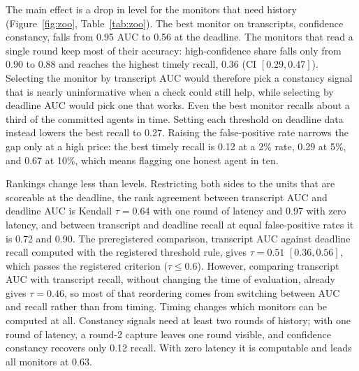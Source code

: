 \documentclass[pdflatex,sn-mathphys-num]{sn-jnl}
\theoremstyle{thmstyleone}%
\begin{document}
The main effect is a drop in level for the monitors that need history (Figure~\ref{fig:zoo}, Table~\ref{tab:zoo}). The best monitor on transcripts, confidence constancy, falls from 0.95 AUC to 0.56 at the deadline. The monitors that read a single round keep most of their accuracy: high-confidence share falls only from 0.90 to 0.88 and reaches the highest timely recall, 0.36 (CI $[0.29, 0.47]$). Selecting the monitor by transcript AUC would therefore pick a constancy signal that is nearly uninformative when a check could still help, while selecting by deadline AUC would pick one that works. Even the best monitor recalls about a third of the committed agents in time. Setting each threshold on deadline data instead lowers the best recall to 0.27. Raising the false-positive rate narrows the gap only at a high price: the best timely recall is 0.12 at a 2\% rate, 0.29 at 5\%, and 0.67 at 10\%, which means flagging one honest agent in ten.

Rankings change less than levels. Restricting both sides to the units that are scoreable at the deadline, the rank agreement between transcript AUC and deadline AUC is Kendall $\tau = 0.64$ with one round of latency and 0.97 with zero latency, and between transcript and deadline recall at equal false-positive rates it is 0.72 and 0.90. The preregistered comparison, transcript AUC against deadline recall computed with the registered threshold rule, gives $\tau = 0.51$ $[0.36, 0.56]$, which passes the registered criterion ($\tau \le 0.6$). However, comparing transcript AUC with transcript recall, without changing the time of evaluation, already gives $\tau = 0.46$, so most of that reordering comes from switching between AUC and recall rather than from timing. Timing changes which monitors can be computed at all. Constancy signals need at least two rounds of history; with one round of latency, a round-2 capture leaves one round visible, and confidence constancy recovers only 0.12 recall. With zero latency it is computable and leads all monitors at 0.63.
\end{document}
